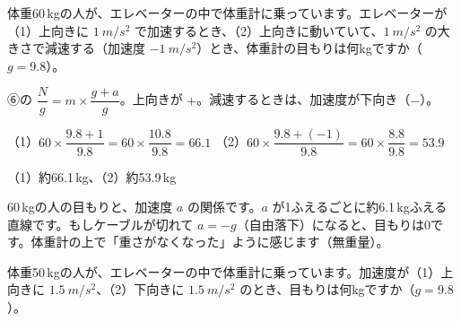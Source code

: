 \begin{reidai}[エレベーターの体重計]
体重60\,kgの人が、エレベーターの中で体重計に乗っています。エレベーターが（1）上向きに $\qty{1}{m/s^2}$ で加速するとき、（2）上向きに動いていて、$\qty{1}{m/s^2}$ の大きさで減速する（加速度 $\qty{-1}{m/s^2}$）とき、体重計の目もりは何kgですか（$g=9.8$）。\par
\kangaekata ⑥の $\dfrac{N}{g}=m\times\dfrac{g+a}{g}$。上向きが $+$。減速するときは、加速度が下向き（$-$）。\par
\shiki（1）$60\times\dfrac{9.8+1}{9.8}=60\times\dfrac{10.8}{9.8}=66.1$\bkvifq
（2）$60\times\dfrac{9.8+(-1)}{9.8}=60\times\dfrac{8.8}{9.8}=53.9$\par
\kotae（1）約66.1\,kg、（2）約53.9\,kg
\end{reidai}
\noindent\begin{minipage}[c]{0.5\linewidth}
\end{minipage}\hfill
\begin{minipage}[c]{0.46\linewidth}\raggedright
60\,kgの人の目もりと、加速度 $a$ の関係です。$a$ が1ふえるごとに約6.1\,kgふえる直線です。もしケーブルが切れて $a=-g$（自由落下）になると、目もりは0です。体重計の上で「重さがなくなった」ように感じます（無重量）。
\end{minipage}
\par\vspace{4pt}

\begin{jibun}
体重50\,kgの人が、エレベーターの中で体重計に乗っています。加速度が（1）上向きに $\qty{1.5}{m/s^2}$、（2）下向きに $\qty{1.5}{m/s^2}$ のとき、目もりは何kgですか（$g=9.8$）。
\end{jibun}

